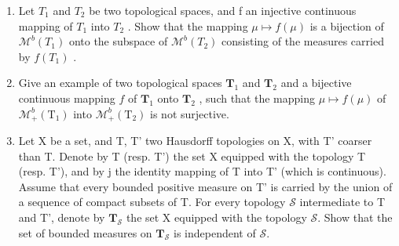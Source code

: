 \exercisesection{}

\begin{enumerate}
\def\labelenumi{\arabic{enumi})}
\item
  Let \(T_{1}\) and \(T_{2}\) be two topological spaces, and f an injective continuous mapping of \(T_{1}\) into \(T_{2}\) . Show that the mapping \(\mu \mapsto f(\mu)\) is a bijection of \(\mathcal{M}^{b}(T_{1})\) onto the subspace of \(\mathcal{M}^{b}(T_{2})\) consisting of the measures carried by \(f(T_{1})\) .
\item
  Give an example of two topological spaces \(\mathbf{T}_1\) and \(\mathbf{T}_2\) and a bijective continuous mapping \(f\) of \(\mathbf{T}_1\) onto \(\mathbf{T}_2\) , such that the mapping \(\mu \mapsto f(\mu)\) of \(\mathcal{M}_+^b (\mathrm{T}_1)\) into \(\mathcal{M}_+^b (\mathrm{T}_2)\) is not surjective.
\item
  Let X be a set, and T, T' two Hausdorff topologies on X, with T' coarser than T. Denote by T (resp. T') the set X equipped with the topology T (resp. T'), and by j the identity mapping of T into T' (which is continuous). Assume that every bounded positive measure on T' is carried by the union of a sequence of compact subsets of T. For every topology \(\mathcal{S}\) intermediate to T and T', denote by \(\mathbf{T}_{\mathcal{S}}\) the set X equipped with the topology \(\mathcal{S}\). Show that the set of bounded measures on \(\mathbf{T}_{\mathcal{S}}\) is independent of \(\mathcal{S}\).
\end{enumerate}
\relax{}
